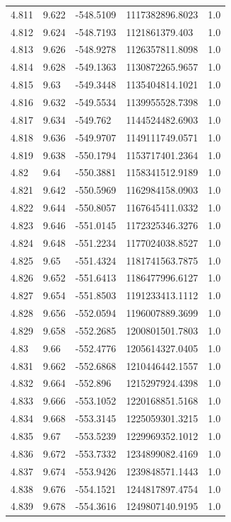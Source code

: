 \begin{tabular}{lllll}
4.811 & 9.622 & -548.5109 & 1117382896.8023 & 1.0 \\
4.812 & 9.624 & -548.7193 & 1121861379.403 & 1.0 \\
4.813 & 9.626 & -548.9278 & 1126357811.8098 & 1.0 \\
4.814 & 9.628 & -549.1363 & 1130872265.9657 & 1.0 \\
4.815 & 9.63 & -549.3448 & 1135404814.1021 & 1.0 \\
4.816 & 9.632 & -549.5534 & 1139955528.7398 & 1.0 \\
4.817 & 9.634 & -549.762 & 1144524482.6903 & 1.0 \\
4.818 & 9.636 & -549.9707 & 1149111749.0571 & 1.0 \\
4.819 & 9.638 & -550.1794 & 1153717401.2364 & 1.0 \\
4.82 & 9.64 & -550.3881 & 1158341512.9189 & 1.0 \\
4.821 & 9.642 & -550.5969 & 1162984158.0903 & 1.0 \\
4.822 & 9.644 & -550.8057 & 1167645411.0332 & 1.0 \\
4.823 & 9.646 & -551.0145 & 1172325346.3276 & 1.0 \\
4.824 & 9.648 & -551.2234 & 1177024038.8527 & 1.0 \\
4.825 & 9.65 & -551.4324 & 1181741563.7875 & 1.0 \\
4.826 & 9.652 & -551.6413 & 1186477996.6127 & 1.0 \\
4.827 & 9.654 & -551.8503 & 1191233413.1112 & 1.0 \\
4.828 & 9.656 & -552.0594 & 1196007889.3699 & 1.0 \\
4.829 & 9.658 & -552.2685 & 1200801501.7803 & 1.0 \\
4.83 & 9.66 & -552.4776 & 1205614327.0405 & 1.0 \\
4.831 & 9.662 & -552.6868 & 1210446442.1557 & 1.0 \\
4.832 & 9.664 & -552.896 & 1215297924.4398 & 1.0 \\
4.833 & 9.666 & -553.1052 & 1220168851.5168 & 1.0 \\
4.834 & 9.668 & -553.3145 & 1225059301.3215 & 1.0 \\
4.835 & 9.67 & -553.5239 & 1229969352.1012 & 1.0 \\
4.836 & 9.672 & -553.7332 & 1234899082.4169 & 1.0 \\
4.837 & 9.674 & -553.9426 & 1239848571.1443 & 1.0 \\
4.838 & 9.676 & -554.1521 & 1244817897.4754 & 1.0 \\
4.839 & 9.678 & -554.3616 & 1249807140.9195 & 1.0 \\

\end{tabular}
